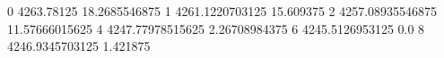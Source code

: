 0 4263.78125 18.2685546875
1 4261.1220703125 15.609375
2 4257.08935546875 11.57666015625
4 4247.77978515625 2.26708984375
6 4245.5126953125 0.0
8 4246.9345703125 1.421875
